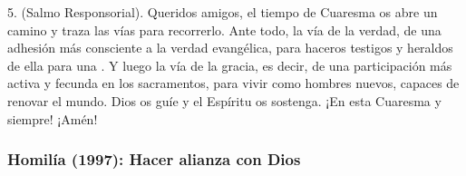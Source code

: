 \begin{body}
5.  (Salmo Responsorial). Queridos amigos, el tiempo de Cuaresma os abre un camino y traza las vías para recorrerlo. Ante todo, la vía de la verdad, de una adhesión más consciente a la verdad evangélica, para haceros testigos y heraldos de ella para una . Y luego la vía de la gracia, es decir, de una participación más activa y fecunda en los sacramentos, para vivir como hombres nuevos, capaces de renovar el mundo. Dios os guíe y el Espíritu os sostenga. ¡En esta Cuaresma y siempre! ¡Amén!
\end{body}

\subsubsection{Homilía (1997): Hacer alianza con Dios}



